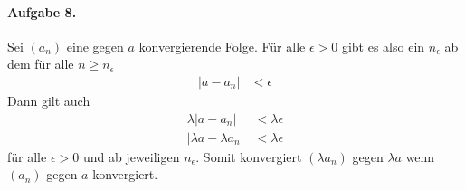 \documentclass{article}
\begin{document}
\paragraph{Aufgabe 8.}

Sei $(a_n)$ eine gegen $a$ konvergierende Folge. Für alle $\epsilon > 0$ gibt es also ein $n_\epsilon$ ab dem für alle $n \geq n_\epsilon$ 
\begin{align*}
    |a - a_n| &< \epsilon
\end{align*}
Dann gilt auch
\begin{align*}
    \lambda|a - a_n| &< \lambda\epsilon \\
    |\lambda a - \lambda a_n| &< \lambda\epsilon
\end{align*}
für alle $\epsilon > 0$ und ab jeweiligen $n_\epsilon$. Somit konvergiert $(\lambda a_n)$ gegen $\lambda a$ wenn $(a_n)$ gegen $a$ konvergiert.
\end{document}
